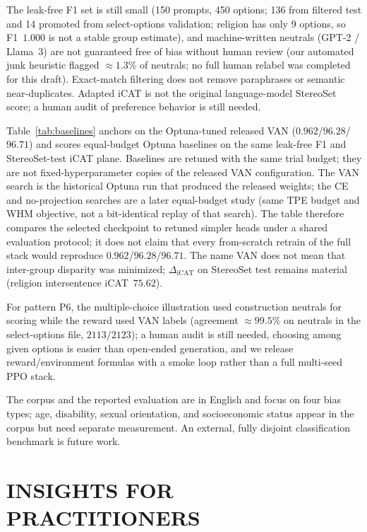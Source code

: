 \documentclass{IEEEcsmag}
\begin{document}
The leak-free F1 set is still small (150 prompts, 450 options; 136 from filtered test and 14 promoted from select-options validation; religion has only 9 options, so F1~$1.000$ is not a stable group estimate), and machine-written neutrals (GPT-2 / Llama~3) are not guaranteed free of bias without human review (our automated junk heuristic flagged $\approx 1.3\%$ of neutrals; no full human relabel was completed for this draft). Exact-match filtering does not remove paraphrases or semantic near-duplicates. Adapted iCAT is not the original language-model StereoSet score; a human audit of preference behavior is still needed.

Table~\ref{tab:baselines} anchors on the Optuna-tuned released VAN ($0.962$/$96.28$/$96.71$) and scores equal-budget Optuna baselines on the same leak-free F1 and StereoSet-test iCAT plane. Baselines are retuned with the same trial budget; they are not fixed-hyperparameter copies of the released VAN configuration. The VAN search is the historical Optuna run that produced the released weights; the CE and no-projection searches are a later equal-budget study (same TPE budget and WHM objective, not a bit-identical replay of that search). The table therefore compares the selected checkpoint to retuned simpler heads under a shared evaluation protocol; it does not claim that every from-scratch retrain of the full stack would reproduce $0.962$/$96.28$/$96.71$. The name VAN does not mean that inter-group disparity was minimized; $\Delta_{\mathrm{iCAT}}$ on StereoSet test remains material (religion intersentence iCAT~$75.62$).

For pattern P6, the multiple-choice illustration used construction neutrals for scoring while the reward used VAN labels (agreement $\approx 99.5\%$ on neutrals in the select-options file, $2113/2123$); a human audit is still needed, choosing among given options is easier than open-ended generation, and we release reward/environment formulas with a smoke loop rather than a full multi-seed PPO stack.

The corpus and the reported evaluation are in English and focus on four bias types; age, disability, sexual orientation, and socioeconomic status appear in the corpus but need separate measurement. An external, fully disjoint classification benchmark is future work.

\section{INSIGHTS FOR PRACTITIONERS}
\end{document}
